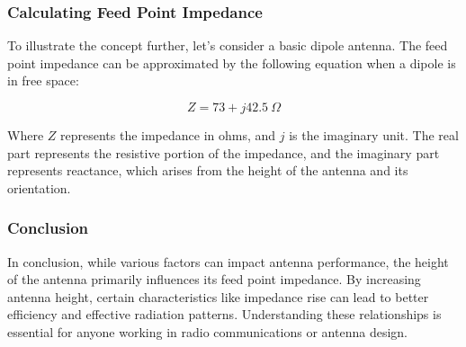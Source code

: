 \subsubsection{Calculating Feed Point Impedance}

To illustrate the concept further, let's consider a basic dipole antenna. The feed point impedance can be approximated by the following equation when a dipole is in free space:

\[
Z = 73 + j42.5 \ \Omega
\]

Where \(Z\) represents the impedance in ohms, and \(j\) is the imaginary unit. The real part represents the resistive portion of the impedance, and the imaginary part represents reactance, which arises from the height of the antenna and its orientation.

\subsubsection{Conclusion}

In conclusion, while various factors can impact antenna performance, the height of the antenna primarily influences its feed point impedance. By increasing antenna height, certain characteristics like impedance rise can lead to better efficiency and effective radiation patterns. Understanding these relationships is essential for anyone working in radio communications or antenna design.
